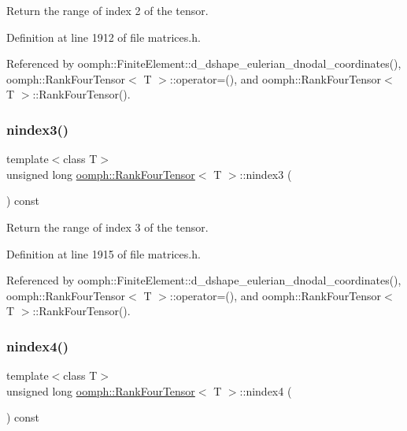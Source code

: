 Return the range of index 2 of the tensor. 



Definition at line 1912 of file matrices.\+h.



Referenced by oomph\+::\+Finite\+Element\+::d\+\_\+dshape\+\_\+eulerian\+\_\+dnodal\+\_\+coordinates(), oomph\+::\+Rank\+Four\+Tensor$<$ T $>$\+::operator=(), and oomph\+::\+Rank\+Four\+Tensor$<$ T $>$\+::\+Rank\+Four\+Tensor().

\mbox{\label{classoomph_1_1RankFourTensor_ab9d4f33cb872d48050eb05c879f19011}} 
\subsubsection{\texorpdfstring{nindex3()}{nindex3()}}
{\footnotesize\ttfamily template$<$class T$>$ \\
unsigned long \hyperlink{classoomph_1_1RankFourTensor}{oomph\+::\+Rank\+Four\+Tensor}$<$ T $>$\+::nindex3 (\begin{DoxyParamCaption}{ }\end{DoxyParamCaption}) const\hspace{0.3cm}{\ttfamily [inline]}}



Return the range of index 3 of the tensor. 



Definition at line 1915 of file matrices.\+h.



Referenced by oomph\+::\+Finite\+Element\+::d\+\_\+dshape\+\_\+eulerian\+\_\+dnodal\+\_\+coordinates(), oomph\+::\+Rank\+Four\+Tensor$<$ T $>$\+::operator=(), and oomph\+::\+Rank\+Four\+Tensor$<$ T $>$\+::\+Rank\+Four\+Tensor().

\mbox{\label{classoomph_1_1RankFourTensor_a5bf51e7091f081ff09d2ef710131b9e0}} 
\subsubsection{\texorpdfstring{nindex4()}{nindex4()}}
{\footnotesize\ttfamily template$<$class T$>$ \\
unsigned long \hyperlink{classoomph_1_1RankFourTensor}{oomph\+::\+Rank\+Four\+Tensor}$<$ T $>$\+::nindex4 (\begin{DoxyParamCaption}{ }\end{DoxyParamCaption}) const\hspace{0.3cm}{\ttfamily [inline]}}



